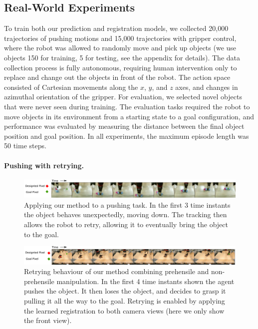 \subsection{Real-World Experiments}

To train both our prediction and registration models, we collected 20,000 trajectories of pushing motions and 15,000 trajectories with gripper control, where the robot was allowed to randomly move and pick up objects (we use objects 150 for training, 5 for testing, see the appendix for details). The data collection process is fully autonomous, requiring human intervention only to replace and change out the objects in front of the robot.
The action space consisted of Cartesian movements along the $x$, $y$, and $z$ axes, and changes in azimuthal orientation of the gripper. For evaluation, we selected novel objects that were never seen during training. The evaluation tasks required the robot to move objects in its environment from a starting state to a goal configuration, and performance was evaluated by measuring the distance between the final object position and goal position. In all experiments, the maximum episode length was 50 time steps.

\vspace{-0.1in}
\paragraph{Pushing with retrying.}
\begin{figure}
    \centering
    \includegraphics[width=1.0\textwidth]{images/push_correction.pdf}
    \caption{\small{Applying our method to a pushing task. In the first 3 time instants the object behaves unexpectedly, moving down. The tracking then allows the robot to retry, allowing it to eventually bring the object to the goal.}}
    \label{fig:push_retry}
\end{figure}

\begin{figure}
\vspace{-0.1in}
    \centering
    \includegraphics[width=1.0\textwidth]{images/pick_place_plush.pdf}
    \caption{\small{Retrying behaviour of our method combining prehensile and non-prehensile manipulation. In the first 4 time instants shown the agent pushes the object. It then loses the object, and decides to grasp it pulling it all the way to the goal. Retrying is enabled by applying the learned registration to both camera views (here we only show the front view).}}
    \label{fig:discrete}
    \vspace{-0.2in}
\end{figure}

